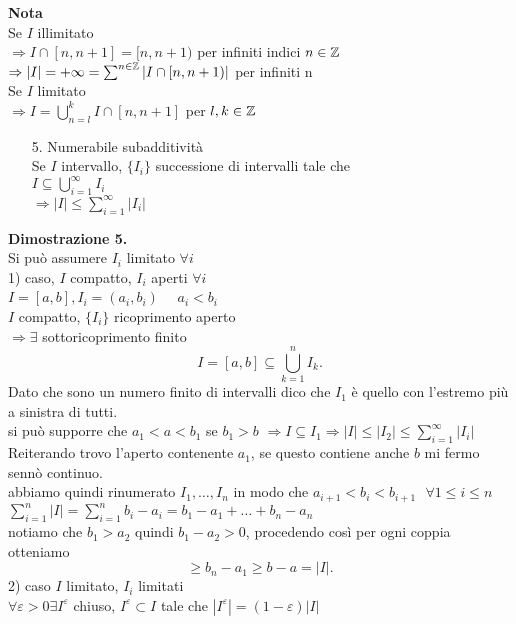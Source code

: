 \documentclass[12px]{article}
\begin{document}
\textbf{Nota}\\
Se $I$ illimitato \\
$ \Rightarrow  I\cap[n,n+1] = [n,n+1) $ per infiniti indici $n\in\mathbb{Z}$\\
$ \Rightarrow |I| = +\infty = \sum^{n\in\mathbb{Z}}|I\cap[n,n+1)|$ per infiniti n\\
Se $I$ limitato\\
$ \Rightarrow  I = \bigcup^k_{n = l}I\cap [n,n+1]$ per $l,k\in\mathbb{Z}$\\
\begin{enumerate}
	\item[5.] Numerabile subadditività\\
		Se $I$ intervallo, $\{I_i\}$ successione di intervalli tale che\\
		$I\subseteq\bigcup^\infty_{i=1} I_i$\\
		$ \Rightarrow  |I|\leq \sum^\infty_{i=1} |I_i|$
\end{enumerate}
\textbf{Dimostrazione 5.}\\
Si può assumere $I_i$ limitato $\forall i$\\
1) caso,  $I$ compatto, $I_i$ aperti $\forall i$\\
$I = [a,b], I_i = (a_i,b_i)$ \ \  $a_i<b_i$\\
$I$ compatto, $\{I_i\}$ ricoprimento aperto\\
$ \Rightarrow \exists$ sottoricoprimento finito
\[
	I = [a,b]\subseteq\bigcup^n_{k=1}I_{k}
.\] 
Dato che sono un numero finito di intervalli dico che $I_1$ è quello con l'estremo più a sinistra di tutti.\\
si può supporre che $a_1 < a < b_1$ se $b_1 > b$ $ \Rightarrow  I\subseteq I_1 \Rightarrow |I| \leq |I_2|\leq \sum^\infty_{i=1}|I_i|$\\
Reiterando trovo l'aperto contenente $a_1$, se questo contiene anche $b$ mi fermo sennò continuo.\\
abbiamo quindi rinumerato $I_1,\ldots,I_n$ in modo che  $a_{i+1} < b_i < b_{i+1} \ \ \ \forall 1\leq i\leq n$\\
 $ \sum^n_{i=1}|I| = \sum^n_{i=1}b_i -a_i = b_1-a_1 + \ldots + b_n-a_n$\\
 notiamo che $b_1 > a_2$ quindi $b_1 - a_2 > 0$, procedendo così per ogni coppia otteniamo
  \[
 \geq b_n - a_1\geq b - a = |I|
 .\] 
 2) caso $I$ limitato, $I_i$ limitati\\
 $\forall\varepsilon > 0 \exists I^\varepsilon$ chiuso, $I^\varepsilon \subset I$ tale che  $ |I^\varepsilon|  = (1-\varepsilon)|I|$\\
\end{document}
